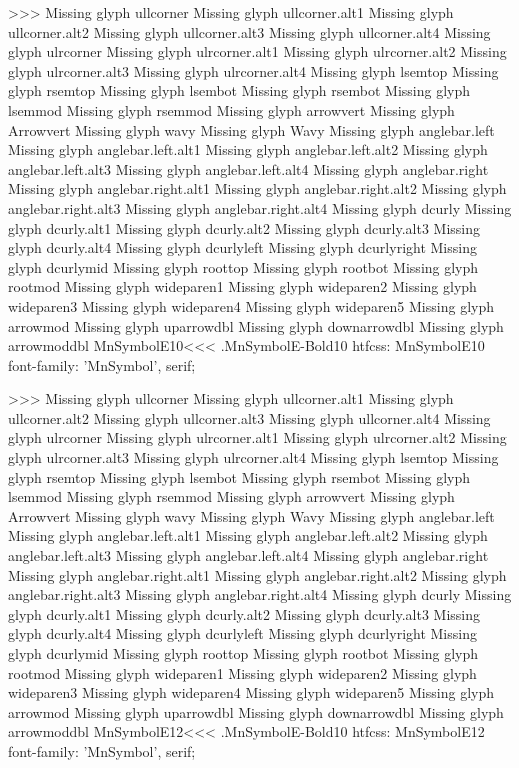 >>>
Missing glyph	ullcorner
Missing glyph	ullcorner.alt1
Missing glyph	ullcorner.alt2
Missing glyph	ullcorner.alt3
Missing glyph	ullcorner.alt4
Missing glyph	ulrcorner
Missing glyph	ulrcorner.alt1
Missing glyph	ulrcorner.alt2
Missing glyph	ulrcorner.alt3
Missing glyph	ulrcorner.alt4
Missing glyph	lsemtop
Missing glyph	rsemtop
Missing glyph	lsembot
Missing glyph	rsembot
Missing glyph	lsemmod
Missing glyph	rsemmod
Missing glyph	arrowvert
Missing glyph	Arrowvert
Missing glyph	wavy
Missing glyph	Wavy
Missing glyph	anglebar.left
Missing glyph	anglebar.left.alt1
Missing glyph	anglebar.left.alt2
Missing glyph	anglebar.left.alt3
Missing glyph	anglebar.left.alt4
Missing glyph	anglebar.right
Missing glyph	anglebar.right.alt1
Missing glyph	anglebar.right.alt2
Missing glyph	anglebar.right.alt3
Missing glyph	anglebar.right.alt4
Missing glyph	dcurly
Missing glyph	dcurly.alt1
Missing glyph	dcurly.alt2
Missing glyph	dcurly.alt3
Missing glyph	dcurly.alt4
Missing glyph	dcurlyleft
Missing glyph	dcurlyright
Missing glyph	dcurlymid
Missing glyph	roottop
Missing glyph	rootbot
Missing glyph	rootmod
Missing glyph	wideparen1
Missing glyph	wideparen2
Missing glyph	wideparen3
Missing glyph	wideparen4
Missing glyph	wideparen5
Missing glyph	arrowmod
Missing glyph	uparrowdbl
Missing glyph	downarrowdbl
Missing glyph	arrowmoddbl
\<MnSymbolE10\><<<
.MnSymbolE-Bold10
htfcss:  MnSymbolE10  font-family: 'MnSymbol', serif;

>>>
Missing glyph	ullcorner
Missing glyph	ullcorner.alt1
Missing glyph	ullcorner.alt2
Missing glyph	ullcorner.alt3
Missing glyph	ullcorner.alt4
Missing glyph	ulrcorner
Missing glyph	ulrcorner.alt1
Missing glyph	ulrcorner.alt2
Missing glyph	ulrcorner.alt3
Missing glyph	ulrcorner.alt4
Missing glyph	lsemtop
Missing glyph	rsemtop
Missing glyph	lsembot
Missing glyph	rsembot
Missing glyph	lsemmod
Missing glyph	rsemmod
Missing glyph	arrowvert
Missing glyph	Arrowvert
Missing glyph	wavy
Missing glyph	Wavy
Missing glyph	anglebar.left
Missing glyph	anglebar.left.alt1
Missing glyph	anglebar.left.alt2
Missing glyph	anglebar.left.alt3
Missing glyph	anglebar.left.alt4
Missing glyph	anglebar.right
Missing glyph	anglebar.right.alt1
Missing glyph	anglebar.right.alt2
Missing glyph	anglebar.right.alt3
Missing glyph	anglebar.right.alt4
Missing glyph	dcurly
Missing glyph	dcurly.alt1
Missing glyph	dcurly.alt2
Missing glyph	dcurly.alt3
Missing glyph	dcurly.alt4
Missing glyph	dcurlyleft
Missing glyph	dcurlyright
Missing glyph	dcurlymid
Missing glyph	roottop
Missing glyph	rootbot
Missing glyph	rootmod
Missing glyph	wideparen1
Missing glyph	wideparen2
Missing glyph	wideparen3
Missing glyph	wideparen4
Missing glyph	wideparen5
Missing glyph	arrowmod
Missing glyph	uparrowdbl
Missing glyph	downarrowdbl
Missing glyph	arrowmoddbl
\<MnSymbolE12\><<<
.MnSymbolE-Bold10
htfcss:  MnSymbolE12  font-family: 'MnSymbol', serif;

